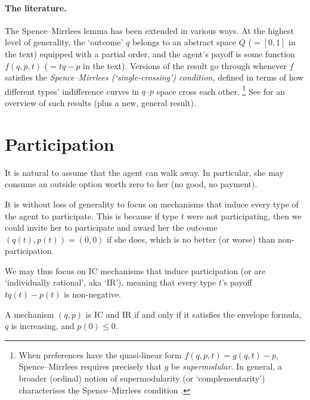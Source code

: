 \paragraph{The literature.}
The Spence--Mirrlees lemma has been extended in various ways.
At the highest level of generality, the `outcome' $q$ belongs to an abstract space $Q$ ($=[0,1]$ in the text) equipped with a partial order,
and the agent's payoff is some function $f(q,p,t)$ ($=tq-p$ in the text).
Versions of the result go through whenever $f$ satisfies the \emph{Spence--Mirrlees (`single-crossing') condition,}
defined in terms of how different types' indifference curves in $q$--$p$ space cross each other.%
	\footnote{When preferences have the quasi-linear form $f(q,p,t) = g(q,t) - p$, Spence--Mirrlees requires precisely that $g$ be \emph{supermodular.}
	In general, a broader (ordinal) notion of supermodularity (or `complementarity') characterises the Spence--Mirrlees condition \parencite[][Theorem 3]{MilgromShannon1994}.}
See \textcite[§4]{Sinander2021} for an overview of such results (plus a new, general result).



\section{Participation}
\label{sec:ch1:part}

It is natural to assume that the agent can walk away.
In particular, she may consume an outside option worth zero to her (no good, no payment).

It is without loss of generality to focus on mechanisms that induce every type of the agent to participate.
This is because if type $t$ were not participating, then we could invite her to participate and award her the outcome $(q(t),p(t)) = (0,0)$ if she does, which is no better (or worse) than non-participation.

We may thus focus on IC mechanisms that induce participation (or are `individually rational', aka `IR'),
meaning that every type $t$'s payoff $t q(t) - p(t)$ is non-negative.

\begin{corollary}
	\label{corollary:ic_ir}
	A mechanism $(q,p)$ is IC and IR if and only if
	it satisfies the envelope formula,
	$q$ is increasing,
	and $p(0) \leq 0$.
\end{corollary}

